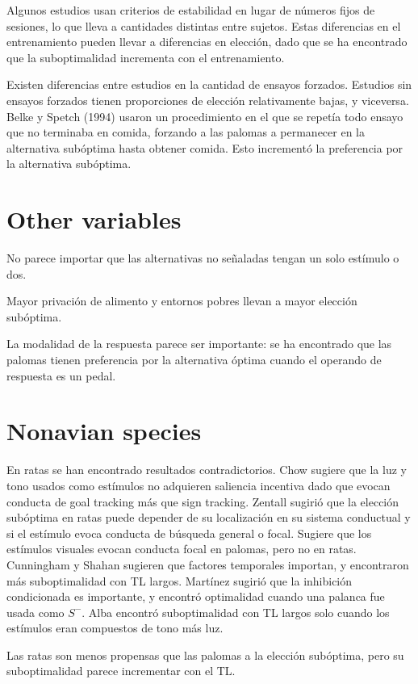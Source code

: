 \documentclass[a4paper,12pt]{article}
\begin{document}
Algunos estudios usan criterios de estabilidad en lugar de números fijos de sesiones, lo que lleva a cantidades distintas entre sujetos.
Estas diferencias en el entrenamiento pueden llevar a diferencias en elección, dado que se ha encontrado que la suboptimalidad incrementa con el entrenamiento.

Existen diferencias entre estudios en la cantidad de ensayos forzados.
Estudios sin ensayos forzados tienen proporciones de elección relativamente bajas, y viceversa.
Belke y Spetch (1994) usaron un procedimiento en el que se repetía todo ensayo que no terminaba en comida, forzando a las palomas a permanecer en la alternativa subóptima hasta obtener comida.
Esto incrementó la preferencia por la alternativa subóptima.

\section{Other variables}

No parece importar que las alternativas no señaladas tengan un solo estímulo o dos.

Mayor privación de alimento y entornos pobres llevan a mayor elección subóptima.

La modalidad de la respuesta parece ser importante: se ha encontrado que las palomas tienen preferencia por la alternativa óptima cuando el operando de respuesta es un pedal.

\section{Nonavian species}

En ratas se han encontrado resultados contradictorios.
Chow sugiere que la luz y tono usados como estímulos no adquieren saliencia incentiva dado que evocan conducta de goal tracking más que sign tracking.
Zentall sugirió que la elección subóptima en ratas puede depender de su localización en su sistema conductual y si el estímulo evoca conducta de búsqueda general o focal.
Sugiere que los estímulos visuales evocan conducta focal en palomas, pero no en ratas.
Cunningham y Shahan sugieren que factores temporales importan, y encontraron más suboptimalidad con TL largos.
Martínez sugirió que la inhibición condicionada es importante, y encontró optimalidad cuando una palanca fue usada como $S^{-}$.
Alba encontró suboptimalidad con TL largos solo cuando los estímulos eran compuestos de tono más luz.

Las ratas son menos propensas que las palomas a la elección subóptima, pero su suboptimalidad parece incrementar con el TL.
\end{document}
